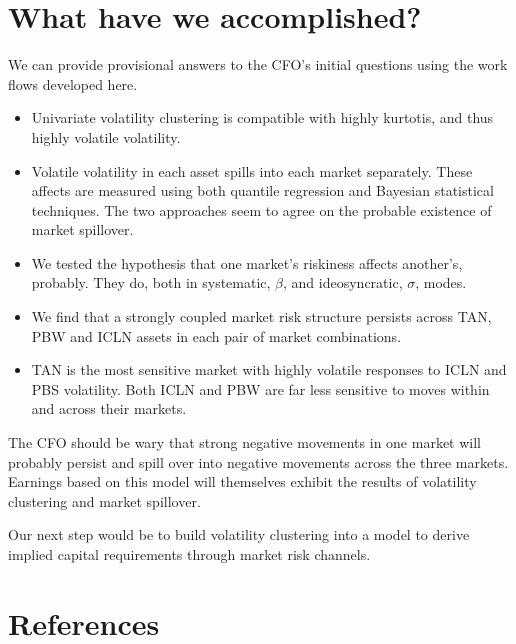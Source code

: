 \documentclass{article}
\begin{document}
\hypertarget{what-have-we-accomplished}{%
\section{What have we accomplished?}\label{what-have-we-accomplished}}

We can provide provisional answers to the CFO's initial questions using
the work flows developed here.

\begin{itemize}
\item
  Univariate volatility clustering is compatible with highly kurtotis,
  and thus highly volatile volatility.
\item
  Volatile volatility in each asset spills into each market separately.
  These affects are measured using both quantile regression and Bayesian
  statistical techniques. The two approaches seem to agree on the
  probable existence of market spillover.
\item
  We tested the hypothesis that one market's riskiness affects
  another's, probably. They do, both in systematic, \(\beta\), and
  ideosyncratic, \(\sigma\), modes.
\item
  We find that a strongly coupled market risk structure persists across
  TAN, PBW and ICLN assets in each pair of market combinations.
\item
  TAN is the most sensitive market with highly volatile responses to
  ICLN and PBS volatility. Both ICLN and PBW are far less sensitive to
  moves within and across their markets.
\end{itemize}

The CFO should be wary that strong negative movements in one market will
probably persist and spill over into negative movements across the three
markets. Earnings based on this model will themselves exhibit the
results of volatility clustering and market spillover.

Our next step would be to build volatility clustering into a model to
derive implied capital requirements through market risk channels.

\hypertarget{references}{%
\section*{References}\label{references}}
\end{document}
